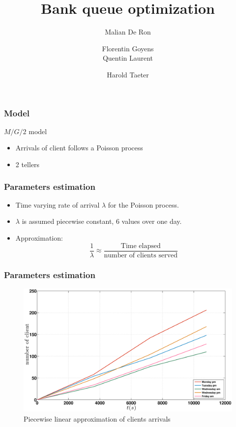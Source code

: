 \documentclass[10pt]{beamer}
\title{Bank queue optimization}
\author[Malian DR, Florentin G, Quentin L, Harlod T]{
  \small
  Malian De Ron
  \and
  Florentin Goyens
  \\
  Quentin Laurent
  \and
  Harold Taeter
}
\begin{document}
\begin{frame}
  \maketitle
\end{frame}

\begin{frame}
  \frametitle{Model}
  \begin{block}{$M/G/2$ model}
  \begin{itemize}
    \item Arrivals of client follows a Poisson process
    \item 2 tellers
    \end{itemize}
  \end{block}
\end{frame}

  \frametitle{Parameters estimation}
 
 \begin{itemize}
 \item Time varying rate of arrival $\lambda$ for the Poisson process. 
 \item $\lambda$ is assumed piecewise constant, 6 values over one day.  
\item Approximation: 
\[\frac{1}{\lambda}\approx \frac{ \text{Time elapsed} }{ \text{number of clients served}}\]  
 \end{itemize}  
  
  
  \begin{frame}
	\frametitle{Parameters estimation}

\begin{figure}
\centering
\includegraphics[width = \textwidth]{../report/images/lambdaApprox.eps}
\caption{Piecewise linear approximation of clients arrivals}
\end{figure}

\end{frame}
  
\end{document}

